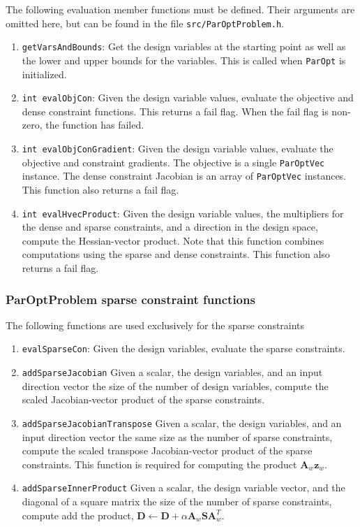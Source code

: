 \documentclass[12pt]{article}
\newcommand{\mb}{\mathbf}
\begin{document}
The following evaluation member functions must be defined. Their arguments are omitted here, but can be found
in the file \texttt{src/ParOptProblem.h}.
\begin{enumerate}
\item \texttt{getVarsAndBounds}: Get the design variables at the starting point as well as the lower and upper bounds for the variables. This is called when \texttt{ParOpt} is initialized. 

\item \texttt{int evalObjCon}: Given the design variable values, evaluate the objective and dense constraint functions. This returns a fail flag. When the fail flag is non-zero, the function has failed.

\item \texttt{int evalObjConGradient}: Given the design variable values, evaluate the objective and constraint gradients. The objective is a single \texttt{ParOptVec} instance. The dense constraint Jacobian is an array of \texttt{ParOptVec} instances. This function also returns a fail flag. 

\item \texttt{int evalHvecProduct}: Given the design variable values, the multipliers for the dense and sparse constraints, and a direction in the design space, compute the Hessian-vector product. Note that this function combines computations using the sparse and dense constraints. This function also returns a fail flag.
\end{enumerate}

\subsubsection{ParOptProblem sparse constraint functions}

The following functions are used exclusively for the sparse constraints
%
\begin{enumerate}
\item \texttt{evalSparseCon}: Given the design variables, evaluate the sparse constraints.

\item \texttt{addSparseJacobian} Given a scalar, the design variables, and an input direction vector the size of the number of design variables, compute the scaled Jacobian-vector product of the sparse constraints.

\item \texttt{addSparseJacobianTranspose} Given a scalar, the design variables, and an input direction vector the same size as the number of sparse constraints, compute the scaled transpose Jacobian-vector product of the sparse constraints. This function is required for computing the product $\mb{A}_{w}\mb{z}_{w}$.

\item \texttt{addSparseInnerProduct} Given a scalar, the design variable vector, and the diagonal of a square matrix the size of the number of sparse constraints, compute add the product, $\mb{D} \leftarrow \mb{D} + \alpha \mb{A}_{w} \mb{S}\mb{A}_{w}^{T}$.
\end{enumerate}
\end{document}

